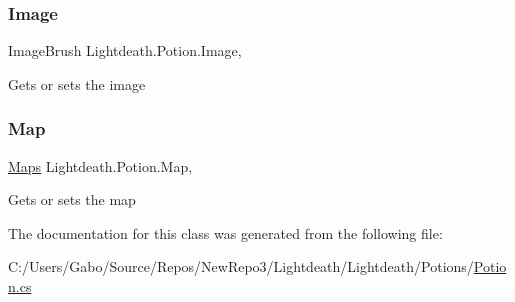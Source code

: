 \subsubsection{\texorpdfstring{Image}{Image}}
{\footnotesize\ttfamily Image\+Brush Lightdeath.\+Potion.\+Image\hspace{0.3cm}{\ttfamily [get]}, {\ttfamily [set]}}



Gets or sets the image 

\hypertarget{class_lightdeath_1_1_potion_a6175131c094693648e52b06683be60fe}{}\label{class_lightdeath_1_1_potion_a6175131c094693648e52b06683be60fe} 
\subsubsection{\texorpdfstring{Map}{Map}}
{\footnotesize\ttfamily \hyperlink{class_lightdeath_1_1_maps}{Maps} Lightdeath.\+Potion.\+Map\hspace{0.3cm}{\ttfamily [get]}, {\ttfamily [set]}}



Gets or sets the map 



The documentation for this class was generated from the following file\+:\begin{DoxyCompactItemize}
\item 
C\+:/\+Users/\+Gabo/\+Source/\+Repos/\+New\+Repo3/\+Lightdeath/\+Lightdeath/\+Potions/\hyperlink{_potion_8cs}{Potion.\+cs}\end{DoxyCompactItemize}
